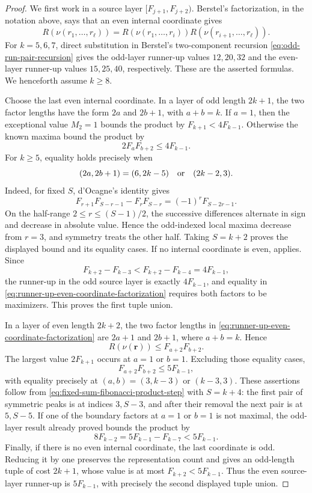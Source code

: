 \begin{proof}
We first work in a source layer
\([F_{j+1},F_{j+2})\).  Berstel's factorization, in the notation above, says
that an even internal coordinate gives
\begin{equation}
 R(\nu(r_1,\ldots,r_\ell))
 =R(\nu(r_1,\ldots,r_i))
  R(\nu(r_{i+1},\ldots,r_\ell)).
 \label{eq:runner-up-even-coordinate-factorization}
\end{equation}
For \(k=5,6,7\), direct substitution in Berstel's two-component recursion
\eqref{eq:odd-run-pair-recursion} gives the odd-layer runner-up values
\(12,20,32\) and the even-layer runner-up values \(15,25,40\), respectively.
These are the asserted formulas.  We henceforth assume \(k\ge8\).

Choose the last even internal coordinate.  In a layer of odd length
\(2k+1\), the two factor lengths have the form \(2a\) and \(2b+1\), with
\(a+b=k\).  If \(a=1\), then the exceptional value \(M_2=1\) bounds the
product by \(F_{k+1}<4F_{k-1}\).  Otherwise the known maxima bound the
product by
\[
 2F_aF_{b+2}\le4F_{k-1}.
\]
For \(k\ge5\), equality holds precisely when
\[
 (2a,2b+1)=(6,2k-5)\quad\hbox{or}\quad(2k-2,3).
\]
Indeed, for fixed \(S\), d'Ocagne's identity gives
\begin{equation}
 F_{r+1}F_{S-r-1}-F_rF_{S-r}
 =(-1)^rF_{S-2r-1}.
 \label{eq:fixed-sum-fibonacci-product-step}
\end{equation}
On the half-range \(2\le r\le(S-1)/2\), the successive differences
alternate in sign and decrease in absolute value.  Hence the odd-indexed
local maxima decrease from \(r=3\), and symmetry treats the other half.
Taking \(S=k+2\) proves the displayed bound and its equality cases.  If no
internal coordinate is even,  applies.  Since
\[
 F_{k+2}-F_{k-3}<F_{k+2}-F_{k-4}=4F_{k-1},
\]
the runner-up in the odd source layer is exactly \(4F_{k-1}\), and equality
in \eqref{eq:runner-up-even-coordinate-factorization} requires both factors
to be maximizers.  This proves the first tuple union.

In a layer of even length \(2k+2\), the two factor lengths in
\eqref{eq:runner-up-even-coordinate-factorization} are \(2a+1\) and
\(2b+1\), where \(a+b=k\).  Hence
\[
 R(\nu(\mathbf r))\le F_{a+2}F_{b+2}.
\]
The largest value \(2F_{k+1}\) occurs at \(a=1\) or \(b=1\).  Excluding
those equality cases,
\[
 F_{a+2}F_{b+2}\le5F_{k-1},
\]
with equality precisely at \((a,b)=(3,k-3)\) or \((k-3,3)\).
These assertions follow from \eqref{eq:fixed-sum-fibonacci-product-step}
with \(S=k+4\): the first pair of symmetric peaks is at indices
\(3,S-3\), and after their removal the next pair is at \(5,S-5\).
If one of
the boundary factors at \(a=1\) or \(b=1\) is not maximal, the odd-layer
result already proved bounds the product by
\[
 8F_{k-2}=5F_{k-1}-F_{k-7}<5F_{k-1}.
\]
Finally, if there is no even internal coordinate, the last coordinate is
odd.  Reducing it by one preserves the representation count and gives an
odd-length tuple of cost \(2k+1\), whose value is at most
\(F_{k+2}<5F_{k-1}\).  Thus the even source-layer runner-up is
\(5F_{k-1}\), with precisely the second displayed tuple union.


\end{proof}
